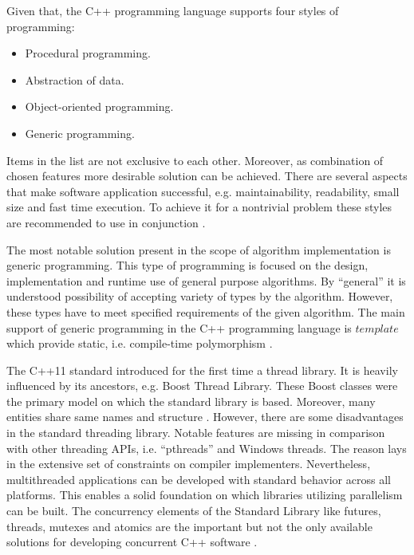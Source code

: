 Given that, the C++ programming language supports four styles of programming:
\begin{itemize}
    \item Procedural programming.
    \item Abstraction of data.
    \item Object-oriented programming.
    \item Generic programming.
\end{itemize}
Items in the list are not exclusive to each other. Moreover, as combination of chosen features
more desirable solution can be achieved. There are several aspects that make software application
successful, e.g. maintainability, readability, small size and fast time execution. To achieve it
for a nontrivial problem these styles are recommended to use in conjunction \cite{cpp_language_bjarne}.

The most notable solution present in the scope of algorithm implementation is generic programming.
This type of programming is focused on the design, implementation and runtime use of general purpose
algorithms. By ``general'' it is understood possibility of accepting variety of types by the algorithm.
However, these types have to meet specified requirements of the given algorithm. The main support
of generic programming in the C++ programming language is $template$ which provide static,
i.e. compile-time polymorphism \cite{cpp_language_bjarne}.

The C++11 standard introduced for the first time a thread library. It is heavily
influenced by its ancestors, e.g. Boost Thread Library. These Boost classes were the primary model
on which the standard library is based. Moreover, many entities share same names and structure \cite{cpp_concurrency}.
However, there are some disadvantages in the standard threading library. Notable features are
missing in comparison with other threading APIs, i.e. ``pthreads'' and Windows threads.
The reason lays in the extensive set of constraints on compiler implementers. Nevertheless,
multithreaded applications can be developed with standard behavior across all platforms.
This enables a solid foundation on which libraries utilizing parallelism can be built.
The concurrency elements of the Standard Library like futures, threads, mutexes and atomics
are the important but not the only available solutions for developing concurrent C++ software \cite{cpp_meyers}.

